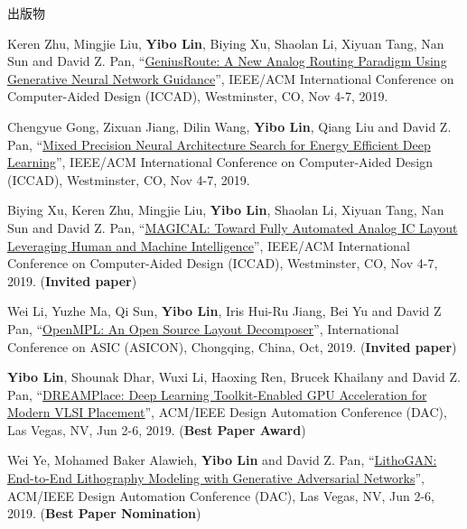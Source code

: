 \begin{rSection}{出版物}
\begin{description}[font=\normalfont, rightmargin=2em]
{}
            

\item[{[C32]}]{
        Keren Zhu, Mingjie Liu, \textbf{Yibo Lin}, Biying Xu, Shaolan Li, Xiyuan Tang, Nan Sun and David Z. Pan, 
    ``\href{https://doi.org/10.1109/ICCAD45719.2019.8942164}{GeniusRoute: A New Analog Routing Paradigm Using Generative Neural Network Guidance}'', 
    IEEE/ACM International Conference on Computer-Aided Design (ICCAD), Westminster, CO, Nov 4-7, 2019.
    
}
            

\item[{[C31]}]{
        Chengyue Gong, Zixuan Jiang, Dilin Wang, \textbf{Yibo Lin}, Qiang Liu and David Z. Pan, 
    ``\href{https://doi.org/10.1109/ICCAD45719.2019.8942147}{Mixed Precision Neural Architecture Search for Energy Efficient Deep Learning}'', 
    IEEE/ACM International Conference on Computer-Aided Design (ICCAD), Westminster, CO, Nov 4-7, 2019.
    
}
            

\item[{[C30]}]{
        Biying Xu, Keren Zhu, Mingjie Liu, \textbf{Yibo Lin}, Shaolan Li, Xiyuan Tang, Nan Sun and David Z. Pan, 
    ``\href{https://doi.org/10.1109/ICCAD45719.2019.8942060}{MAGICAL: Toward Fully Automated Analog IC Layout Leveraging Human and Machine Intelligence}'', 
    IEEE/ACM International Conference on Computer-Aided Design (ICCAD), Westminster, CO, Nov 4-7, 2019.
    (\textbf{Invited paper})
}
            

\item[{[C29]}]{
        Wei Li, Yuzhe Ma, Qi Sun, \textbf{Yibo Lin}, Iris Hui-Ru Jiang, Bei Yu and David Z Pan, 
    ``\href{https://arxiv.org/abs/1809.07554}{OpenMPL: An Open Source Layout Decomposer}'', 
    International Conference on ASIC (ASICON), Chongqing, China, Oct, 2019.
    (\textbf{Invited paper})
}
            

\item[{[C28]}]{
        \textbf{Yibo Lin}, Shounak Dhar, Wuxi Li, Haoxing Ren, Brucek Khailany and David Z. Pan, 
    ``\href{https://doi.org/10.1145/3316781.3317803}{DREAMPlace: Deep Learning Toolkit-Enabled GPU Acceleration for Modern VLSI Placement}'', 
    ACM/IEEE Design Automation Conference (DAC), Las Vegas, NV, Jun 2-6, 2019.
    (\textbf{Best Paper Award})
}
            

\item[{[C27]}]{
        Wei Ye, Mohamed Baker Alawieh, \textbf{Yibo Lin} and David Z. Pan, 
    ``\href{https://doi.org/10.1145/3316781.3317852}{LithoGAN: End-to-End Lithography Modeling with Generative Adversarial Networks}'', 
    ACM/IEEE Design Automation Conference (DAC), Las Vegas, NV, Jun 2-6, 2019.
    (\textbf{Best Paper Nomination})
}
            


\end{description}
\end{rSection}
